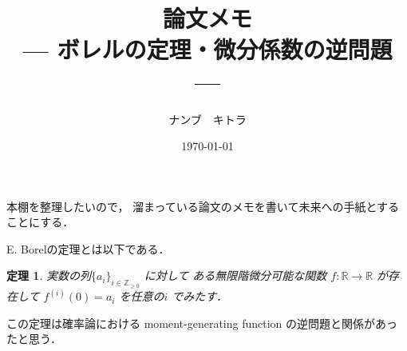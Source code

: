\documentclass[leqno, a4paper, 12pt]{jsarticle}
\title{論文メモ
\large{\\--- ボレルの定理・微分係数の逆問題 ---}
}
\author{ナンブ　キトラ}
\date{\today}
\newtheorem{thm}{定理}
\newcommand{\zz}{\mathbb{Z}}
\newcommand{\rr}{\mathbb{R}}
\begin{document}
\maketitle

本棚を整理したいので，
溜まっている論文のメモを書いて未来への手紙とすることにする．

E. Borelの定理とは以下である．
\begin{thm}
実数の列$\{a_{i}\}_{i\in \zz_{\ge 0}}$
に対して
ある無限階微分可能な関数
$f\colon \rr\to \rr$
が存在して
$f^{(i)}(0)=a_{i}$
を任意の$i$
でみたす．
\end{thm}
この定理は確率論における
moment-generating function 
の逆問題と関係があったと思う．





\nocite{*}


\end{document}
